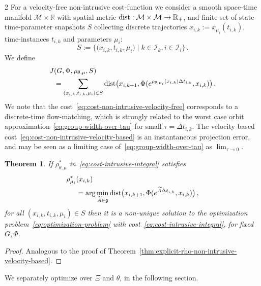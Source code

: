 \documentclass{article}
\newtheorem{theorem}{Theorem}[section]
\newtheorem{proof}{Proof}[theorem]
\newcommand{\M}{\mathcal{M}}                                %
\newcommand{\g}{\mathfrak{g}}                               %
\newcommand{\R}{\mathbb{R}}                                 %
\newcommand{\state}{x}
\begin{document}
\begin{multicols}{2}
For a velocity-free non-intrusive cost-function we consider a smooth space-time manifold $\M\times\R$ with spatial metric $\textnormal{dist}:\M\times\M\rightarrow\R_+$, and finite set of state-time-parameter snapshots $S$ collecting discrete trajectories $\state_{i,k} := \state_{\mu_i}(t_{i,k})$, time-instances $t_{i,k}$ and parameters $\mu_i$:
\begin{equation}\label{eq:snapshots-velocity-free}
    S:= \{\big(\state_{i,k}, t_{i,k}, \mu_i\big) \;|\; k \in \mathcal{I}_k, i \in \mathcal{I}_i \}\,.
\end{equation}
We define
\begin{align}\label{eq:cost-non-intrusive-velocity-free}
    J&(G,\Phi,\rho_{\theta,\mu},S) \\
     &= \sum_{(\state_{i,k}, t_{i,k}, \mu_i)\in S} \textnormal{dist}\big(\state_{i,k+1},\Phi(e^{\rho_{\theta,\mu_i}(\state_{i,k})\Delta t_{i,k}},\state_{i,k})\big)\,. \nonumber
\end{align}
We note that the cost~\eqref{eq:cost-non-intrusive-velocity-free} corresponds to a discrete-time flow-matching, which is strongly related to the worst case orbit approximation~\eqref{eq:group-width-over-tau} for small $\tau = \Delta t_{i,k}$. The velocity based cost~\eqref{eq:cost-non-intrusive-velocity-based} is an instantaneous projection error, and may be seen as a limiting case of~\eqref{eq:group-width-over-tau} as $\lim_{\tau\rightarrow 0}$. 
\begin{theorem}\label{thm:explicit-rho-non-intrusive-velocity-free}
    If $\rho^*_{\theta,\mu}$ in~\eqref{eq:cost-intrusive-integral} satisfies 
    \begin{align}\label{eq:solution-rho-cost-non-intrusive-velocity-free}
        \rho^*_{\mu_i}&(\state_{i,k}) \\ &= \arg\min_{\widetilde{A}\in\g} \textnormal{dist}\big(\state_{i,k+1},\Phi(e^{\widetilde{A}\Delta t_{i,k}},\state_{i,k})\big)\,, \nonumber
    \end{align}
    for all $(\state_{i,k},t_{i,k}, \mu_i)\in S$ then it is a non-unique solution to the optimization problem~\eqref{eq:optimization-problem} with cost~\eqref{eq:cost-intrusive-integral}, for fixed $G,\Phi$.
\end{theorem}
\begin{proof}
    Analogous to the proof of Theorem~\ref{thm:explicit-rho-non-intrusive-velocity-based}.
\end{proof}
We separately optimize over $\Xi$ and $\theta$, in the following section. %


\end{multicols}
\end{document}
